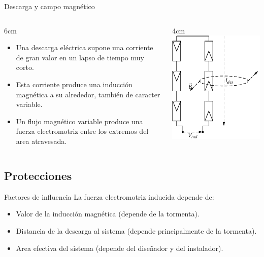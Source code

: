 \documentclass[xcolor={usenames,svgnames,dvipsnames}]{beamer}
\begin{document}
\begin{frame}[label=sec-4-1-6]{Descarga y campo magnético}
\begin{columns}
\begin{column}{6cm\textwidth}
\begin{itemize}
\item Una descarga eléctrica supone una corriente de gran valor en un lapso de tiempo muy corto.

\item Esta corriente produce una inducción magnética a su alrededor, también de caracter variable.

\item Un flujo magnético variable produce una fuerza electromotriz entre los extremos del area atravesada.
\end{itemize}
\end{column}
\begin{column}{4cm\textwidth}
\includegraphics[height=0.9\textheight]{../figs/SobretensionInducida.pdf}
\end{column}
\end{columns}
\end{frame}

\subsection{Protecciones}
\label{sec-4-2}

\begin{frame}[label=sec-4-2-1]{Factores de influencia}
La fuerza electromotriz inducida depende de:

\begin{itemize}
\item \alert{Valor de la inducción magnética} (depende de la tormenta).

\item \alert{Distancia} de la descarga al sistema (depende principalmente de la
tormenta).

\item \alert{Area efectiva del sistema} (depende del diseñador y del instalador).
\end{itemize}
\end{frame}
\end{document}
